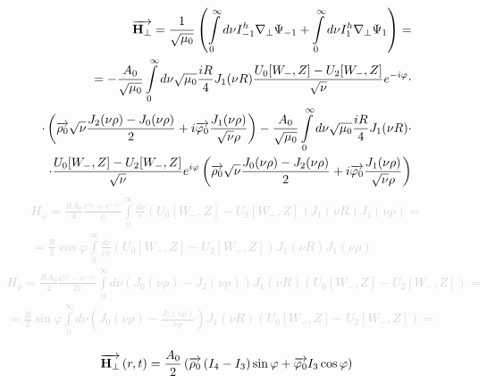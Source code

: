 %
\textcolor{lightgray} { \begin{equation*} \begin{aligned}
\overrightarrow{\mathbf H_\perp} = \frac{1}{\sqrt{\mu_0}} \left( 
\int \limits_{0}^{\infty} d \nu I_{-1}^h \nabla_\perp \Psi_{-1} +
\int \limits_{0}^{\infty} d \nu I_1^h \nabla_\perp \Psi_1 \right) = \\
= - \frac{A_0}{\sqrt{\mu_0}} \int \limits_{0}^{\infty} d \nu
\sqrt{\mu_0} \frac{iR}{4} J_1 (\nu R)
\frac{ U_0 [ W_-, Z ] - U_2 [ W_-, Z ] }{\sqrt{\nu}}  
e^{- i \varphi} \cdot \\ \cdot \left( \overrightarrow{\mathbf \rho_0} 
\sqrt{\nu} \frac{ J_{2}(\nu \rho) - J_{0}(\nu \rho) }{2} +
i \overrightarrow{\mathbf \varphi_0} \frac{J_1(\nu \rho)}{\sqrt{\nu} \rho} \right) -
\frac{A_0}{\sqrt{\mu_0}} \int \limits_{0}^{\infty} d \nu 
\sqrt{\mu_0} \frac{iR}{4} J_1 (\nu R) \cdot \\
\cdot \frac{ U_0 [ W_-, Z ] - U_2 [ W_-, Z ] }{\sqrt{\nu}} 
e^{i \varphi} \left( \overrightarrow{\mathbf \rho_0} 
\sqrt{\nu} \frac{ J_{0}(\nu \rho) - J_{2}(\nu \rho) }{2} +
i \overrightarrow{\mathbf \varphi_0} \frac{J_1(\nu \rho)}{\sqrt{\nu} \rho} \right)
\end{aligned} \end{equation*} }
%
\textcolor{lightgray} { \begin{equation*} \begin{aligned}
H_\varphi = \frac{R A_0}{4} 
\frac{e^{i \varphi} + e^{- i \varphi}}{\rho} \int \limits_{0}^{\infty} 
\frac{d\nu}{\nu} (U_0[ W_-, Z ] - U_2[ W_-, Z ]) J_1(\nu R) J_1(\nu \rho) = \\
= \frac{R}{2} \cos \varphi \int \limits_{0}^{\infty}
\frac{d\nu}{\nu \rho} (U_0[ W_-, Z ] - U_2[ W_-, Z ]) 
J_1(\nu R) J_1(\nu \rho)
\end{aligned} \end{equation*} }
%
\textcolor{lightgray} { \begin{equation*} \begin{aligned}
H_\rho = \frac{R A_0}{4} \frac{e^{i \varphi} - e^{- i \varphi}}{2i}
\int \limits_{0}^{\infty} d \nu (J_{0}(\nu \rho) - J_{2}(\nu \rho))
J_1(\nu R) (U_0[ W_-, Z ] - U_2[ W_-, Z ]) = \\
= \frac{R}{2} \sin \varphi \int \limits_{0}^{\infty} d \nu 
(J_0(\nu \rho) - \frac{J_1(\nu \rho)}{\nu \rho})
J_1(\nu R) (U_0[ W_-, Z ] - U_2[ W_-, Z ]) = \\
\end{aligned} \end{equation*} }
%
\textcolor{lightgray} { \begin{equation*} \begin{aligned}
\overrightarrow{\mathbf H_\perp} \left( r, t \right) = \frac{A_0}{2} \left( 
\overrightarrow{\mathbf \rho_0} \left( I_4 - I_3 \right) \sin \varphi +
\overrightarrow{\mathbf \varphi_0} I_3 \cos \varphi  \right)
\end{aligned} \end{equation*} }
